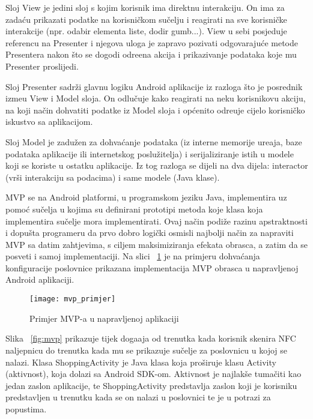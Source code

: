Sloj View je jedini sloj s kojim korisnik ima direktnu interakciju. On ima za zada\'{c}u prikazati podatke na korisni\v{c}kom su\v{c}elju i reagirati na sve korisni\v{c}ke interakcije (npr. odabir elementa liste, dodir gumb...). View u sebi posjeduje referencu na Presenter i njegova uloga je zapravo pozivati odgovaraju\'{c}e metode Presentera nakon \v{s}to se dogodi odre\dj ena akcija i prikazivanje podataka koje mu Presenter proslijedi.

Sloj Presenter sadr\v{z}i glavnu logiku Android aplikacije iz razloga \v{s}to je posrednik izme\dj u View i Model sloja. On odlu\v{c}uje kako reagirati na neku korisnikovu akciju, na koji na\v{c}in dohvatiti podatke iz Model sloja i op\'{c}enito odre\dj uje cijelo korisni\v{c}ko iskustvo sa aplikacijom.

Sloj Model je zadu\v{z}en za dohva\'{c}anje podataka (iz interne memorije ure\dj aja, baze podataka aplikacije ili internetskog poslu\v{z}itelja) i serijaliziranje istih u modele koji se koriste u ostatku aplikacije. Iz tog razloga se dijeli na dva dijela: interactor (vr\v{s}i interakciju sa podacima) i same modele (Java klase).

MVP se na Android platformi, u programskom jeziku Java, implementira uz pomo\'{c} su\v{c}elja u kojima su definirani prototipi metoda koje klasa koja implementira su\v{c}elje mora implementirati. Ovaj na\v{c}in podi\v{z}e razinu apstraktnosti i dopu\v{s}ta programeru da prvo dobro logi\v{c}ki osmisli najbolji na\v{c}in za napraviti MVP sa datim zahtjevima, s ciljem maksimiziranja efekata obrasca, a zatim da se posveti i samoj implementaciji. Na slici ~\ref{fig:mvp_primjer} je na primjeru dohva\'{c}anja konfiguracije poslovnice prikazana implementacija MVP obrasca u napravljenoj Android aplikaciji.


\begin{figure}[!htbp]
	\begin{center}
 \texttt{[image: mvp\_primjer]}
 \caption{Primjer MVP-a u napravljenoj aplikaciji}
 \label{fig:mvp_primjer}
	\end{center}
\end{figure}

Slika ~\ref{fig:mvp} prikazuje tijek doga\dj aja od trenutka kada korisnik skenira NFC naljepnicu do trenutka kada mu se prikazuje su\v{c}elje za poslovnicu u kojoj se nalazi. Klasa ShoppingActivity je Java klasa koja pro\v{s}iruje klasu Activity (aktivnost), koja dolazi sa Android SDK-om. Aktivnost je najlak\v{s}e tuma\v{c}iti kao jedan zaslon aplikacije, te ShoppingActivity predstavlja zaslon koji je korisniku predstavljen u trenutku kada se on nalazi u poslovnici te je u potrazi za popustima.

